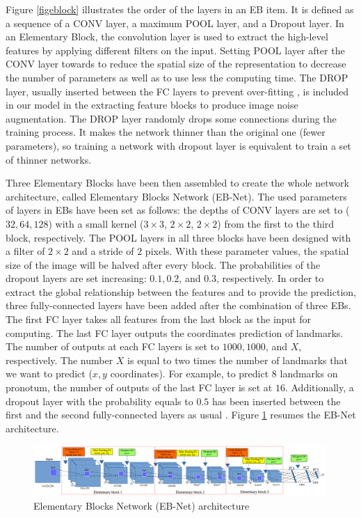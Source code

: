 \documentclass[review]{elsarticle}
\begin{document}
Figure \ref{figeblock} illustrates the order of the layers in an EB
item. It is defined as a sequence of a CONV layer, a maximum POOL
layer, and a Dropout layer. In an Elementary Block, the convolution
layer is used to extract the high-level features by applying different
filters on the input. Setting POOL layer after the CONV layer towards
to reduce the spatial size of the representation to decrease the
number of parameters as well as to use less the computing time. The
DROP layer, usually inserted between the FC layers to prevent
over-fitting \cite{lecun2015deep, krizhevsky2012imagenet}, is
included in our model in the extracting feature blocks to produce
image noise augmentation. The DROP layer randomly drops some 
connections during the training process. It makes the network thinner
than the original one (fewer parameters), so training a network with
dropout layer is equivalent to train a set of thinner networks.

Three Elementary Blocks have been then assembled to create the whole network
architecture, called Elementary Blocks Network (EB-Net). The used
parameters of layers in EBs have been set as follows: the depths of
CONV layers are set to ($32, 64, 128$) with a small kernel
($3 \times 3$, $2 \times 2$, $2 \times 2$) from the first to the third
block, respectively. The POOL layers in all three blocks have been
designed with a filter of $2 \times 2$ and a stride of $2$
pixels. With these parameter values, the spatial size of the image
will be halved after every block. The probabilities of the dropout
layers are set increasing: $0.1, 0.2$, and $0.3$, respectively. In
order to extract the global relationship between the features and to
provide the prediction, three fully-connected layers have been added
after the combination of three EBs. The first FC layer takes all features
from the last block as the input for computing. The last FC layer
outputs the coordinates prediction of landmarks. The number of outputs
at each FC layers is set to $1000, 1000$, and $X$, respectively. The
number $X$ is equal to two times the number of landmarks that we want to
predict ($x, y$ coordinates). For example, to predict $8$ landmarks on
pronotum, the number of outputs of the last FC
layer is set at $16$. Additionally, a dropout layer with the probability equals to
$0.5$ has been inserted between the first and the second
fully-connected layers as usual 
\cite{hinton2012improving}. Figure \ref{figebnet} resumes the EB-Net
architecture.



\begin{figure}[h!]
	\centering
	\includegraphics[width=0.99\textwidth]{images/arch_model}
	\caption{Elementary Blocks Network (EB-Net) architecture}
	\label{figebnet}
\end{figure}
\end{document}
